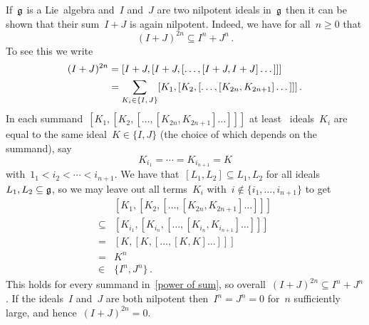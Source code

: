 \begin{remark}
  If~$\mathfrak{g}$ is a Lie~algebra and~$I$ and~$J$ are two nilpotent ideals in~$\mathfrak{g}$ then it can be shown that their sum~$I+J$ is again nilpotent.
  Indeed, we have for all~$n \geq 0$ that
  \[
    (I + J)^{2n}
    \subseteq
    I^n + J^n \,.
  \]
  To see this we write
  \begin{equation}
    \label{power of sum}
    \begin{aligned}
      (I + J)^{2n}
      &=
      [I+J, [I+J, [\dotsc, [I+J, I+J] \dotsc] ] ]
      \\
      &=
      \sum_{K_i \in \{I, \, J\}}
      [K_1, [K_2, [\dotsc, [K_{2n}, K_{2n+1}] \dotsc] ] ] \,.
    \end{aligned}
  \end{equation}
  In each summand~$[K_1, [K_2, [\dotsc, [K_{2n}, K_{2n+1}] \dotsc] ] ]$ at least~{} ideals~$K_i$ are equal to the same ideal~$K \in \{I, J\}$ (the choice of which depends on the summand), say
  \[
    K_{i_1}
    =
    \dotsb
    =
    K_{i_{n+1}}
    =
    K
  \]
  with~$1_1 < i_2 < \dotsb < i_{n+1}$.
  We have that~$[L_1, L_2] \subseteq L_1, L_2$ for all ideals~$L_1, L_2 \subseteq \mathfrak{g}$, so we may leave out all terms~$K_i$ with~$i \notin \{i_1, \dotsc, i_{n+1}\}$ to get
  \begin{align*}
    {}&
    [K_1, [K_2, [\dotsc, [K_{2n}, K_{2n+1}] \dotsc] ] ]
    \\
    \subseteq{}&
    [K_{i_1}, [K_{i_n}, [\dotsc, [K_{i_n}, K_{i_{n+1}}] \dotsc] ] ]
    \\
    ={}&
    [K, [K, [\dotsc, [K, K] \dotsc] ] ]
    \\
    ={}&
    K^n
    \\
    \in{}&
    \{I^n, J^n\}  \,.
  \end{align*}
  This holds for every summand in~\eqref{power of sum}, so overall~$(I + J)^{2n} \subseteq I^n + J^n$ .
  If the ideals~$I$ and~$J$ are both nilpotent then~$I^n = J^n = 0$ for~$n$ sufficiently large, and hence~$(I + J)^{2n} = 0$.

\end{remark}

